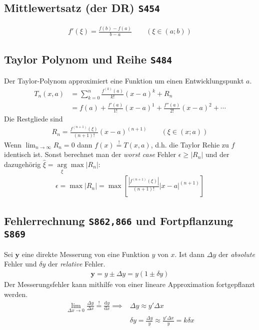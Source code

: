 \documentclass[a4paper, twocolumn]{article}
\newcommand{\noticeq}{\ensuremath{\stackrel{!}{=}}}
\newcommand{\dd}[1]{\ensuremath{\mathrm{d}#1}}
\newcommand{\df}[2]{\ensuremath{\frac{\dd{#1}}{\dd{#2}}}}
\newcommand{\brpage}[1]{\textcolor{red!70!black}{\small\texttt{S#1}}}
\begin{document}
{\subsection{Mittlewertsatz (der DR) \brpage{454}}
\begin{align*}
  f'(\xi) = \frac{f(b) - f(a)}{b-a} \qquad (\xi \in (a;b))
\end{align*}

\subsection{Taylor Polynom und Reihe \brpage{484}}
Der Taylor-Polynom approximiert eine Funktion um einen Entwicklungspunkt \(a\).
\begin{align*}
  T_n(x, a) &= \sum_{k=0}^n\frac{f^{(k)}(a)}{k!}(x-a)^k + R_n\\
  &= f(a) + \frac{f'(a)}{1!}(x-a)^1 + \frac{f''(a)}{2!}(x-a)^2 + \cdots
\end{align*}
Die Restgliede sind
\begin{align*}
  R_n = \frac{f^{(n+1)}(\xi)}{(n+1)!} (x-a)^{(n+1)} \qquad (\xi \in (x;a))
\end{align*}
Wenn \(\lim_{n\to\infty}R_n = 0\) dann \(f(x) \noticeq T(x,a)\), d.h. die Taylor Rehie zu \(f\) identisch ist. Sonst berechnet man der \emph{worst case} Fehler \(\epsilon \geq |R_n|\) und der dazugeh\"orig \(\hat{\xi} = \underset{\xi}{\arg}\max|R_n|\):
\begin{align*}
  \epsilon
  = \max |R_n|
  = \max \left[\frac{|f^{(n+1)}(\xi)|}{(n+1)!} |x-a|^{(n+1)}\right]
\end{align*}

\subsection{Fehlerrechnung \brpage{862,866} und Fortpflanzung \brpage{869}}
Sei \(\mathbf{y}\) eine direkte Messerung von eine Funktion \(y\) von \(x\). Ist dann \(\Delta y\) der \emph{absolute} Fehler und \(\delta y\) der \emph{relative} Fehler.
\begin{align*}
  \mathbf{y} = y \pm \Delta y = y(1 \pm \delta y)
\end{align*}
Der Messerungsfehler kann mithilfe von einer lineare Approximation fortgepflanzt werden.
\begin{align*}
  \lim_{\Delta x\to 0} \frac{\Delta y}{\Delta x} \noticeq \df{y}{x}
  \implies &\Delta y \approx y'\Delta x \\
  & \delta y = \frac{\Delta y}{y} \approx \frac{y'\Delta x}{y}
  = k\delta x
\end{align*}

}
\end{document}
